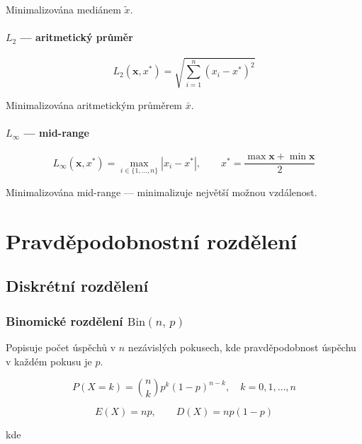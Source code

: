 \documentclass[a4paper, 11pt]{article}
\begin{document}
Minimalizována mediánem $\tilde{x}$.

\paragraph{$L_2$ — aritmetický průměr}\mbox{}\par
\begin{equation*}
	L_2(\mathbf{x}, x^*) = \sqrt{\sum_{i=1}^{n} (x_i - x^*)^2}
\end{equation*}

Minimalizována aritmetickým průměrem $\bar{x}$.

\paragraph{$L_\infty$ — mid-range}\mbox{}\par
\begin{equation*}
	L_\infty(\mathbf{x}, x^*) = \max_{i \in \{1,\ldots,n\}} |x_i - x^*|, \qquad
	x^* = \frac{\max \mathbf{x} + \min \mathbf{x}}{2}
\end{equation*}

Minimalizována mid-range --- minimalizuje největší možnou vzdálenost.


\clearpage
\section{Pravděpodobnostní rozdělení}

\subsection{Diskrétní rozdělení}

\subsubsection{Binomické rozdělení $\mathrm{Bin}(n,\,p)$}

Popisuje počet úspěchů v $n$ nezávislých pokusech, kde pravděpodobnost
úspěchu v každém pokusu je $p$.

\begin{equation*}
	P(X = k) = \binom{n}{k} p^k (1-p)^{n-k}, \quad k = 0, 1, \ldots, n
\end{equation*}

\begin{equation*}
	E(X) = np, \qquad D(X) = np(1-p)
\end{equation*}

kde
\end{document}
